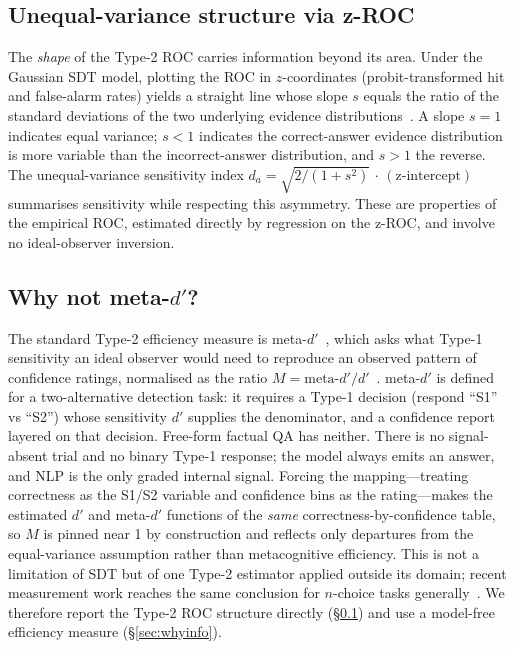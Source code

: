 \documentclass{article}
\begin{document}
\subsection{Unequal-variance structure via z-ROC}
\label{sec:zroc}

The \emph{shape} of the Type-2 ROC carries information beyond its area. Under the Gaussian SDT model, plotting the ROC in $z$-coordinates (probit-transformed hit and false-alarm rates) yields a straight line whose slope $s$ equals the ratio of the standard deviations of the two underlying evidence distributions~\citep{green1966signal, macmillan2005detection}. A slope $s=1$ indicates equal variance; $s<1$ indicates the correct-answer evidence distribution is more variable than the incorrect-answer distribution, and $s>1$ the reverse. The unequal-variance sensitivity index $d_a = \sqrt{2/(1+s^2)}\,\cdot\,(\text{z-intercept})$ summarises sensitivity while respecting this asymmetry. These are properties of the empirical ROC, estimated directly by regression on the z-ROC, and involve no ideal-observer inversion.

\subsection{Why not meta-$d'$?}
\label{sec:whynotmetad}

The standard Type-2 efficiency measure is meta-$d'$~\citep{maniscalco2012signal, maniscalco2014signal}, which asks what Type-1 sensitivity an ideal observer would need to reproduce an observed pattern of confidence ratings, normalised as the ratio $M = \text{meta-}d'/d'$~\citep{fleming2014measure}. meta-$d'$ is defined for a two-alternative detection task: it requires a Type-1 decision (respond ``S1'' vs ``S2'') whose sensitivity $d'$ supplies the denominator, and a confidence report layered on that decision. Free-form factual QA has neither. There is no signal-absent trial and no binary Type-1 response; the model always emits an answer, and NLP is the only graded internal signal. Forcing the mapping---treating correctness as the S1/S2 variable and confidence bins as the rating---makes the estimated $d'$ and meta-$d'$ functions of the \emph{same} correctness-by-confidence table, so $M$ is pinned near 1 by construction and reflects only departures from the equal-variance assumption rather than metacognitive efficiency. This is not a limitation of SDT but of one Type-2 estimator applied outside its domain; recent measurement work reaches the same conclusion for $n$-choice tasks generally~\citep{rahnev2025measuring}. We therefore report the Type-2 ROC structure directly (\S\ref{sec:zroc}) and use a model-free efficiency measure (\S\ref{sec:whyinfo}).
\end{document}
